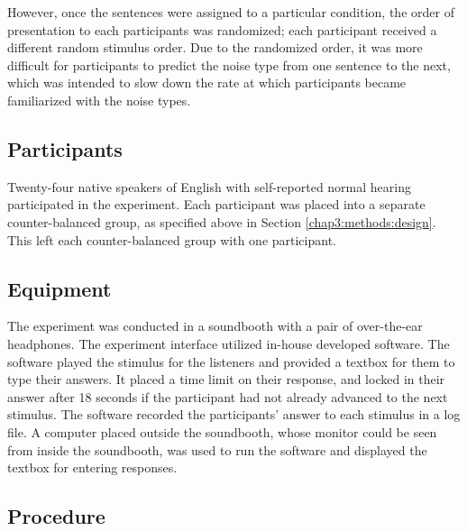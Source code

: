 \DIFdelend \DIFaddbegin {}\DIFaddend However, once the sentences were assigned to a particular condition, the order of presentation to each participants was randomized; each participant received a different random stimulus order.  Due to the randomized order, it was more difficult for participants to predict the noise type from one sentence to the next, which was intended to slow down the rate at which participants became familiarized with the noise types.

\subsection{Participants}
\label{chap3:methods:participants}

Twenty-four native speakers of English with self-reported normal hearing participated in the experiment. \DIFaddbegin {}\DIFaddend Each participant was placed into a separate counter-balanced group, as specified above in Section \ref{chap3:methods:design}.  This left each counter-balanced group with one participant.

\subsection{Equipment}
\label{chap3:methods:equipment}

The experiment was conducted in a soundbooth with a pair of over-the-ear headphones.  The experiment interface utilized in-house developed software.  The software played the stimulus for the listeners and provided a textbox for them to type their answers.  It placed a time limit on their response, and locked in their answer after 18 seconds if the participant had not already advanced to the next stimulus. \DIFaddbegin {}\DIFaddend The software recorded the participants' answer to each stimulus in a log file.  A computer placed outside the soundbooth, whose monitor could be seen from inside the soundbooth, was used to run the software and displayed the textbox for entering responses.

\subsection{Procedure}
\label{chap3:methods:procedure}

